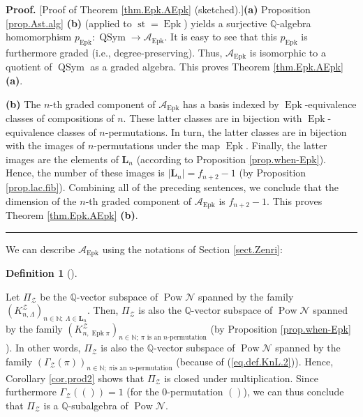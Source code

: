 \documentclass[numbers=enddot,12pt,final,onecolumn,notitlepage]{scrartcl}%
\theoremstyle{definition}
\newtheorem{defi}[theo]{Definition}
\newenvironment{definition}[1][]
{\begin{defi}[#1]\begin{leftbar}}
{\end{leftbar}\end{defi}}
\newenvironment{proof}[1][Proof]{\noindent\textbf{#1.} }{\ \rule{0.5em}{0.5em}}
\newenvironment{verlong}{}{}
\newcommand{\NN}{\mathbb{N}}
\begin{document}
\begin{verlong}
\begin{proof}
[Proof of Theorem \ref{thm.Epk.AEpk} (sketched).]\textbf{(a)} Proposition
\ref{prop.Ast.alg} \textbf{(b)} (applied to $\operatorname{st}
=\operatorname{Epk}$) yields a surjective $\mathbb{Q}$-algebra homomorphism
$p_{\operatorname{Epk}}:\operatorname*{QSym}\rightarrow\mathcal{A}%
_{\operatorname{Epk}}$. It is easy to see that this $p_{\operatorname{Epk}}$
is furthermore graded (i.e., degree-preserving). Thus, $\mathcal{A}%
_{\operatorname{Epk}}$ is isomorphic to a quotient of $\operatorname*{QSym}$
as a graded algebra. This proves Theorem \ref{thm.Epk.AEpk} \textbf{(a)}.

\textbf{(b)} The $n$-th graded component of
$\mathcal{A}_{\operatorname{Epk}}$ has a basis
indexed by $\operatorname{Epk}$-equivalence classes of
compositions of $n$. These latter classes are in bijection with
$\operatorname{Epk}$-equivalence classes of $n$-permutations. In turn, the
latter classes are in bijection with the images of $n$-permutations under the
map $\operatorname{Epk}$. Finally, the latter images are the elements of
$\mathbf{L}_n$ (according to Proposition \ref{prop.when-Epk}).
Hence, the number of these images is $\left|\mathbf{L}_n\right|
= f_{n+2} - 1$ (by Proposition \ref{prop.lac.fib}). Combining all of the
preceding sentences, we conclude that the dimension of the $n$-th graded
component of $\mathcal{A}_{\operatorname{Epk}}$ is $f_{n+2}-1$. This proves
Theorem \ref{thm.Epk.AEpk} \textbf{(b)}.
\end{proof}
\end{verlong}

We can describe $\mathcal{A}_{\operatorname{Epk}}$ using the notations
of Section \ref{sect.Zenri}:

\begin{definition}
Let $\Pi_{\mathcal{Z}}$ be the $\mathbb{Q}$-vector subspace of
$\operatorname*{Pow}\mathcal{N}$ spanned by the family $\left(  K_{n,\Lambda
}^{\mathcal{Z}}\right)  _{n \in \NN;\  \Lambda \in \mathbf{L}_n}  $.
Then, $\Pi_{\mathcal{Z}}$ is also the $\mathbb{Q}$-vector subspace of
$\operatorname*{Pow}\mathcal{N}$ spanned by the family $\left(
K_{n,\operatorname{Epk}\pi}^{\mathcal{Z}}\right)  _{n\in\mathbb{N}%
;\ \pi\text{ is an }n\text{-permutation}}$ (by Proposition \ref{prop.when-Epk}%
). In other words, $\Pi_{\mathcal{Z}}$ is also the $\mathbb{Q}$-vector
subspace of $\operatorname*{Pow}\mathcal{N}$ spanned by the family $\left(
\Gamma_{\mathcal{Z}}\left(  \pi\right)  \right)  _{n\in\mathbb{N};\ \pi\text{
is an }n\text{-permutation}}$ (because of (\ref{eq.def.KnL.2})). Hence,
Corollary \ref{cor.prod2} shows that $\Pi_{\mathcal{Z}}$ is closed under
multiplication. Since furthermore $\Gamma_{\mathcal{Z}}\left(
\left( \right) \right)  =1$ (for the $0$-permutation
$\left( \right)$), we can thus conclude that $\Pi
_{\mathcal{Z}}$ is a $\mathbb{Q}$-subalgebra of $\operatorname*{Pow}%
\mathcal{N}$.
\end{definition}
\end{document}
